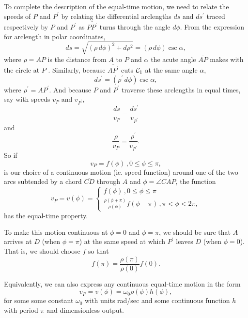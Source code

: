 \documentclass{ximera}
\begin{document}
To complete the description of the equal-time motion, we need to relate the speeds of $P$ and $P^\prime$ by relating the differential arclengths $ds$ and $ds^\prime$ traced respectively by $P$ and $P^\prime$ as $\overline{PP^\prime}$ turns through the angle $d\phi$. From the expression for arclength in polar coordinates,  
\begin{equation}
   ds =  \sqrt{(\rho \, d\phi)^2 + d\rho^2}   =   (\rho \, d\phi) \csc \alpha ,   \label{Eq:ArcLength}
\end{equation}
where $\rho = AP$ is the distance from $A$ to $P$ and $\alpha$ the acute angle $\overline{AP}$ makes with the circle at $P$ . Similarly, because $\overline{AP^\prime}$ cuts ${\cal C}_1$ at the same angle $\alpha$,
\begin{equation}
   ds^\prime =   (\rho^\prime \, d\phi) \csc \alpha ,  \label{Eq:ArcLength2}
\end{equation}
where $\rho^\prime = AP^\prime$. And because $P$ and $P^\prime$ traverse these arclengths in equal times, say with speeds $v_P$ and $v_{P^\prime}$, 
\[
   \frac{ds}{v_P} = \frac{ds^\prime}{v_{P^\prime}}
\] 
and
\begin{equation}
    \frac{\rho}{v_P} = \frac{\rho^\prime}{v_{P^\prime}} .  \label{Eq:SpeedCondition}
\end{equation}
So if 
\[
  v_P = f(\phi) \, , 0\leq \phi \leq \pi , 
\]
is our choice of a continuous motion (ie. speed function) around one of the two arcs subtended by a chord $\overline{CD}$ through $A$ and $\phi = \angle CAP$, the function
\[
   v_P = v(\phi)  = 
\begin{cases}
          f(\phi) \, , 0\leq \phi \leq \pi \\
         \frac{\rho (\phi + \pi)}{\rho (\phi)} f(\phi-\pi) \, , \pi < \phi < 2\pi ,
\end{cases}
\]
has the equal-time property. %

To make this motion continuous at $\phi=0$ and $\phi= \pi$, we should be sure that $A$ arrives at $D$ (when $\phi=\pi$) at the same speed at which $P^\prime$ leaves $D$ (when $\phi = 0$). That is, we should choose $f$ so that 
\[
   f(\pi) =  \frac{\rho(\pi)}{\rho(0)} f(0) .
\]


Equivalently, we can also express any continuous equal-time motion in the form
\[
      v_P = v(\phi) = \omega_0 \rho (\phi) h(\phi) ,
\]
for some some constant $\omega_0$ with units rad/sec and some continuous function $h$ with period $\pi$ and dimensionless output.
\end{document}
